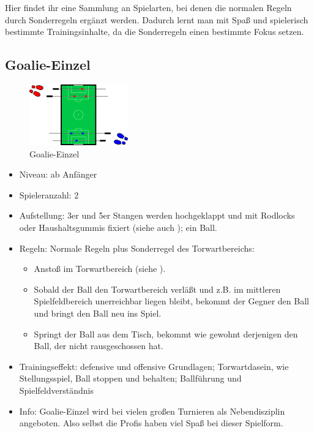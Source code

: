 Hier findet ihr eine Sammlung an Spielarten, bei denen die normalen Regeln durch Sonderregeln ergänzt werden. 
Dadurch lernt man mit Spaß und spielerisch bestimmte Trainingsinhalte, da die Sonderregeln einen bestimmte Fokus setzen. 

\subsection{Goalie-Einzel}
\label{spielformen:sonderregeln:goalie}

\begin{figure}
\centering 
\includegraphics[width=0.38\textwidth]{img/spielform_goalie.pdf} 
\caption{Goalie-Einzel} 
\label{fig:goalie} 
\end{figure}

\begin{itemize}
\item Niveau: ab Anfänger
\item Spieleranzahl: 2
\item Aufstellung: 3er und 5er Stangen werden hochgeklappt und mit Rodlocks oder Haushaltsgummis fixiert (siehe auch ); ein Ball.
\item Regeln: Normale Regeln plus Sonderregel des Torwartbereichs: 
  \begin{itemize}
  \item Anstoß im Torwartbereich (siehe ).
  \item Sobald der Ball den Torwartbereich verläßt und z.B. im mittleren Spielfeldbereich unerreichbar liegen bleibt, bekommt der Gegner den Ball und bringt den Ball neu ins Spiel.
  \item Springt der Ball aus dem Tisch, bekommt wie gewohnt derjenigen den Ball, der nicht rausgeschossen hat. 
  \end{itemize}
\item Trainingseffekt: defensive und offensive Grundlagen; Torwartdasein, wie Stellungsspiel, Ball stoppen und behalten; Ballführung und Spielfeldverständnis
\item Info: Goalie-Einzel wird bei vielen großen Turnieren als Nebendisziplin angeboten. Also selbst die Profis haben viel Spaß bei dieser Spielform.
\end{itemize}


